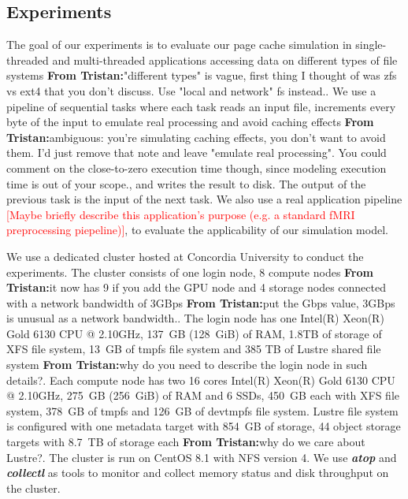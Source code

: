 \documentclass[conference]{IEEEtran}
\newcommand{\tristan}[1]{\color{orange}\textbf{From Tristan:}#1\color{black}}
\begin{document}
		\subsection{Experiments}
		
        	The goal of our experiments is to evaluate our page cache 
			simulation in single-threaded and multi-threaded applications
			accessing data on different types of file systems \tristan{"different types" is vague, first thing I thought of was zfs vs ext4 that you don't discuss. Use "local and network" fs instead.}. 
			We use a pipeline
			of sequential tasks where each task reads an input file, increments
			every byte of the input to emulate real processing and avoid caching
			effects \tristan{ambiguous: you're simulating caching effects, you don't want to avoid them. I'd just remove that note and leave "emulate real processing". You could comment on 
			the close-to-zero execution time though, since modeling execution time is out of your scope.}, and writes the result to disk. The output of the previous
			task is the input of the next task. We also use a real application 
            pipeline \textcolor{red}{[Maybe briefly describe this application's purpose (e.g. a standard fMRI preprocessing piepeline)]}, to evaluate the applicability of our simulation model. 
			
			We use a dedicated cluster hosted at Concordia University to conduct 
			the experiments. The cluster consists of one login node, 8 compute nodes \tristan{it now has 9 if you add the GPU node}
			and 4 storage nodes connected with a network bandwidth of 3GBps \tristan{put the Gbps value, 3GBps is unusual as a network bandwidth.}. 
			The login node has one Intel(R) Xeon(R) Gold 6130 CPU @ 2.10GHz, 
			137~GB (128~GiB) of RAM, 1.8TB of storage of XFS file system, 
			13~GB of tmpfs file system and 385 TB of Lustre shared file system \tristan{why do you need to describe the login node in such details?}. 
			Each compute node has two 16 cores Intel(R) Xeon(R) Gold 6130 CPU @ 2.10GHz, 
			275~GB (256~GiB) of RAM and 6 SSDs, 450~GB each with XFS file system, 
			378~GB of tmpfs and 126~GB of devtmpfs file system.
			Lustre file system is configured with one metadata target with 854~GB 
			of storage, 44 object storage targets with 8.7~TB of storage each \tristan{why do we care about Lustre?}. 
			The cluster is run on CentOS 8.1 with NFS version 4. 
			We use \textbf{\textit{atop}} and \textbf{\textit{collectl}} as tools to 
			monitor and collect memory status and disk throughput 
			on the cluster. 
			
\end{document}
